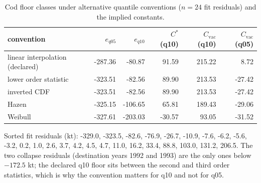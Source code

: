 \begin{table}[H]
\centering
\caption{Cod floor classes under alternative quantile conventions ($n=24$ fit residuals) and the implied constants.}
\label{tab:si-quantiles}
\small
\begin{tabular}{lrrrrr}
\toprule
convention & $e_{q05}$ & $e_{q10}$ & $C^*$ (q10) & $C_{\mathrm{vac}}$ (q10) & $C_{\mathrm{vac}}$ (q05) \\
\midrule
linear interpolation (declared) & -287.36 & -80.87 & 91.59 & 215.22 & 8.72 \\
lower order statistic & -323.51 & -82.56 & 89.90 & 213.53 & -27.42 \\
inverted CDF & -323.51 & -82.56 & 89.90 & 213.53 & -27.42 \\
Hazen & -325.15 & -106.65 & 65.81 & 189.43 & -29.06 \\
Weibull & -327.61 & -203.03 & -30.57 & 93.05 & -31.52 \\
\bottomrule
\end{tabular}
\par\smallskip\begin{minipage}{0.97\linewidth}\footnotesize Sorted fit residuals (kt): -329.0, -323.5, -82.6, -76.9, -26.7, -10.9, -7.6, -6.2, -5.6, -3.2, 0.2, 1.0, 2.6, 3.7, 4.2, 4.5, 4.7, 11.0, 16.2, 33.4, 88.8, 103.0, 131.2, 206.5. The two collapse residuals (destination years 1992 and 1993) are the only ones below $-172.5$ kt; the declared q10 floor sits between the second and third order statistics, which is why the convention matters for q10 and not for q05.\end{minipage}
\end{table}
